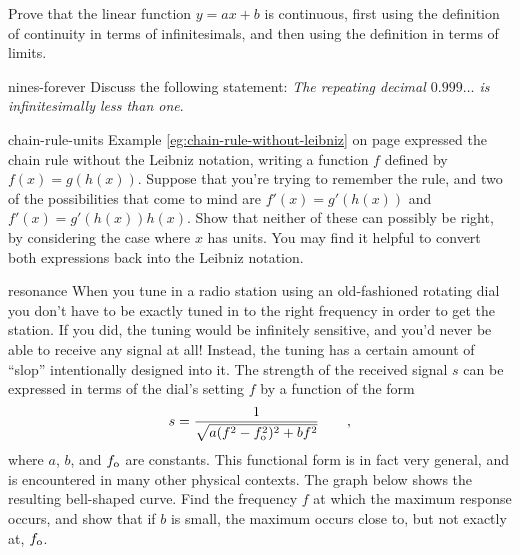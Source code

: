 \begin{hwsection}
\begin{hw}
Prove that the linear function $y=ax+b$ is continuous, first using the definition of
continuity in terms of infinitesimals, and then using the definition in terms of
limits.
\end{hw}

\begin{hwwithsoln}{nines-forever}
Discuss the following statement: \emph{The repeating decimal $0.999\ldots$ is infinitesimally less than one}.
\end{hwwithsoln}

\begin{hwwithsoln}{chain-rule-units}
Example \ref{eg:chain-rule-without-leibniz} on page \pageref{eg:chain-rule-without-leibniz}
expressed the chain rule without the Leibniz notation, writing a function $f$ defined by
$f(x)=g(h(x))$. Suppose that you're trying to remember the rule, and two of the possibilities
that come to mind are $f'(x)=g'(h(x))$ and $f'(x)=g'(h(x))h(x)$. Show that neither of these
can possibly be right, by considering the case where $x$ has units. You may find it helpful
to convert both expressions back into the Leibniz notation.
\end{hwwithsoln}

\begin{hwwithsoln}{resonance}
When you tune in a radio station using an old-fashioned rotating dial you don't have to be
exactly tuned in to the right frequency in order to get the station. If you did, the
tuning would be infinitely sensitive, and you'd never be able to receive any signal at
all! Instead, the tuning has a certain amount of ``slop'' intentionally designed into it.
The strength of the received signal $s$ can be expressed in terms of the dial's setting
$f$ by a function of the form
\begin{equation*}
  s = \frac{1}{\sqrt{a(f^2-f_{\textup{o}}^2)^2+bf^2}} \qquad ,
\end{equation*}
where $a$, $b$, and $f_{\textup{o}}$ are constants. This functional form is in fact very general, and
is encountered in many other physical contexts. The graph below shows the resulting bell-shaped
curve. Find the frequency $f$ at which the maximum response occurs, and show that if $b$ is small,
the maximum occurs close to, but not exactly at, $f_{\textup{o}}$.
\end{hwwithsoln}

%


\end{hwsection}
